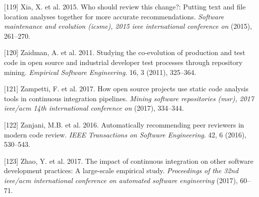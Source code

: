 \documentclass[]{book}
\begin{document}
\hypertarget{ref-xia2015should}{}
{[}119{]} Xia, X. et al. 2015. Who should review this change?: Putting
text and file location analyses together for more accurate
recommendations. \emph{Software maintenance and evolution (icsme), 2015
ieee international conference on} (2015), 261--270.

\hypertarget{ref-zaidman2011studying}{}
{[}120{]} Zaidman, A. et al. 2011. Studying the co-evolution of
production and test code in open source and industrial developer test
processes through repository mining. \emph{Empirical Software
Engineering}. 16, 3 (2011), 325--364.

\hypertarget{ref-zampetti2017open}{}
{[}121{]} Zampetti, F. et al. 2017. How open source projects use static
code analysis tools in continuous integration pipelines. \emph{Mining
software repositories (msr), 2017 ieee/acm 14th international conference
on} (2017), 334--344.

\hypertarget{ref-zanjani2016automatically}{}
{[}122{]} Zanjani, M.B. et al. 2016. Automatically recommending peer
reviewers in modern code review. \emph{IEEE Transactions on Software
Engineering}. 42, 6 (2016), 530--543.

\hypertarget{ref-zhao2017impact}{}
{[}123{]} Zhao, Y. et al. 2017. The impact of continuous integration on
other software development practices: A large-scale empirical study.
\emph{Proceedings of the 32nd ieee/acm international conference on
automated software engineering} (2017), 60--71.
\end{document}
